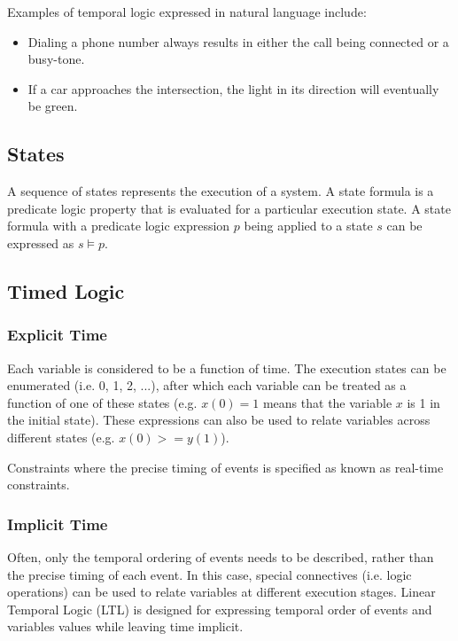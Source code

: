 \documentclass[12pt,titlepage]{article}
\begin{document}
      Examples of temporal logic expressed in natural language include:
      \begin{itemize}
        \item Dialing a phone number always results in either the call being connected or a busy-tone.
        \item If a car approaches the intersection, the light in its direction will eventually be green.
      \end{itemize}

    \subsection{States}
      A sequence of states represents the execution of a system. A state formula is a predicate logic property that is evaluated for a particular execution state.
      A state formula with a predicate logic expression $p$ being applied to a state $s$ can be expressed as $s \vDash p$.

    \subsection{Timed Logic}

      \subsubsection{Explicit Time}
        Each variable is considered to be a function of time. The execution states can be enumerated (i.e. 0, 1, 2, ...), after which each variable can be treated
        as a function of one of these states (e.g. $x(0) = 1$ means that the variable $x$ is 1 in the initial state). These expressions can also be used to relate
        variables across different states (e.g. $x(0) >= y(1)$).

        Constraints where the precise timing of events is specified as known as real-time constraints.

      \subsubsection{Implicit Time}
        Often, only the temporal ordering of events needs to be described, rather than the precise timing of each event. In this case, special connectives
        (i.e. logic operations) can be used to relate variables at different execution stages. Linear Temporal Logic (LTL) is designed for expressing
        temporal order of events and variables values while leaving time implicit.
\end{document}
